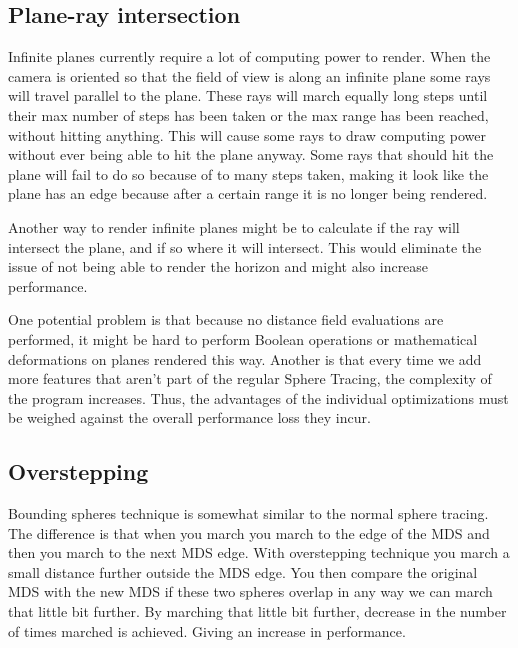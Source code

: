 		\subsection{Plane-ray intersection}

			Infinite planes currently require a lot of computing power to 
			render. When the camera is oriented so that the field of view is 
			along an infinite plane some rays will travel parallel to the plane. 
			These rays will march equally long steps until their max number of 
			steps has been taken or	the max range has been reached, without 
			hitting anything. This will cause some rays to draw computing power 
			without ever being able to hit the plane anyway. Some rays that 
			should hit the plane will fail to do so because of to many steps 
			taken, making it look like the plane has an edge because after a 
			certain range it is no longer being rendered.


			Another way to render infinite planes might be to 
			calculate if the ray will intersect the plane, and if so where it 
			will intersect. This would eliminate the issue of not being able 
			to render the horizon and might also increase performance.

			One potential problem is that because no distance field evaluations 
			are performed, it might be hard to perform Boolean operations or 
			mathematical deformations on planes rendered this way. Another is 
			that every time we add more features that aren't part of the regular 
			Sphere Tracing, the complexity of the program increases. Thus, the 
			advantages of the individual optimizations must be weighed against 
			the overall performance loss they incur. 

		\subsection{Overstepping}

			Bounding spheres technique is somewhat similar to the normal sphere
			tracing. The difference is that when you march you march to the
			edge of the MDS and then you march to the next MDS edge. With
			overstepping technique you march a small distance further
			outside the MDS edge. You then compare the original MDS with the
			new MDS if these two spheres overlap in any way we can march that
			little bit further. By marching that little bit further, decrease
			in the number of times marched is achieved. Giving an increase in
			performance. 
			
